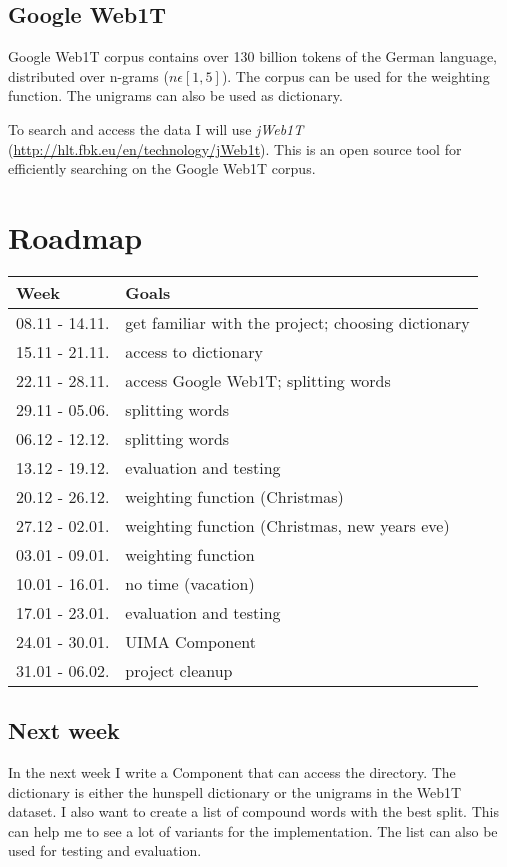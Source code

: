 \documentclass[11pt, accentcolor=tud9b, nochapname]{tudexercise}
\begin{document}
\subsection{Google Web1T}
Google Web1T corpus contains over 130 billion tokens of the German
language, distributed over n-grams ($n \epsilon [1,5]$). The corpus
can be used for the weighting function. The unigrams can also be used
as dictionary.

To search and access the data I will use \emph{jWeb1T}
(\url{http://hlt.fbk.eu/en/technology/jWeb1t}). This is an open source
  tool for efficiently searching on the Google Web1T corpus.

\section{Roadmap}

\begin{longtable}{|l|l|}
\hline
\textbf{Week} & \textbf{Goals} \\ \hline
08.11 - 14.11. & get familiar with the project; choosing dictionary \\ \hline
15.11 - 21.11. & access to dictionary \\ \hline
22.11 - 28.11. & access Google Web1T; splitting words \\ \hline
29.11 - 05.06. & splitting words \\ \hline
06.12 - 12.12. & splitting words \\ \hline
13.12 - 19.12. & evaluation and testing \\ \hline
20.12 - 26.12. & weighting function (Christmas) \\ \hline
27.12 - 02.01. & weighting function (Christmas, new years eve) \\ \hline
03.01 - 09.01. & weighting function \\ \hline
10.01 - 16.01. & no time (vacation) \\ \hline
17.01 - 23.01. & evaluation and testing \\ \hline
24.01 - 30.01. & UIMA Component \\ \hline
31.01 - 06.02. & project cleanup \\
\hline
\end{longtable}

\subsection{Next week}
In the next week I write a Component that can access the
directory. The dictionary is either the hunspell dictionary or the
unigrams in the Web1T dataset. I also want to create a list of
compound words with the best split. This can help me to see a lot of
variants for the implementation. The list can also be used for testing
and evaluation.




\end{document}
